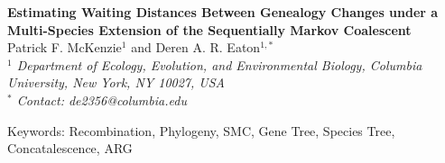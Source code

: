 \documentclass[11pt]{article}
\begin{document}
\begin{center}
	{\bf \Large
		Estimating Waiting Distances Between Genealogy Changes under a \\[0.25cm]
		Multi-Species Extension of the Sequentially Markov Coalescent
	}\\[0.5cm]

	Patrick F. McKenzie$^{1}$ and Deren A. R. Eaton$^{1, *}$\\[0.25cm]

	\emph{
	$^{1}$ Department of Ecology, Evolution, and Environmental Biology, Columbia University, New York, NY 10027, USA\\[0.5cm]
	$^{*}$ Contact: de2356@columbia.edu\\[0.5cm]
	}
\end{center}

Keywords: Recombination, Phylogeny, SMC, Gene Tree, Species Tree, Concatalescence, ARG

\RaggedRight

\end{document}
